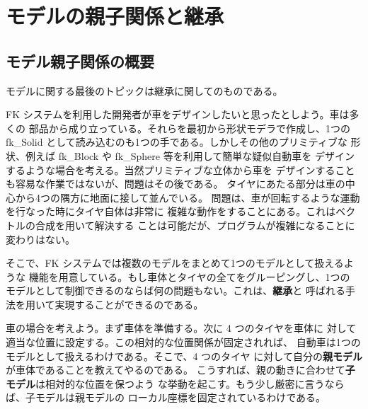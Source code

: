 \section{モデルの親子関係と継承}
\subsection{モデル親子関係の概要}
モデルに関する最後のトピックは継承に関してのものである。

FK システムを利用した開発者が車をデザインしたいと思ったとしよう。車は多くの
部品から成り立っている。それらを最初から形状モデラで作成し、1つの
fk\_Solid として読み込むのも1つの手である。しかしその他のプリミティブな
形状、例えば fk\_Block や fk\_Sphere 等を利用して簡単な疑似自動車を
デザインするような場合を考える。当然プリミティブな立体から車を
デザインすることも容易な作業ではないが、問題はその後である。
タイヤにあたる部分は車の中心から4つの隅方に地面に接して並んでいる。
問題は、車が回転するような運動を行なった時にタイヤ自体は非常に
複雑な動作をすることにある。これはベクトルの合成を用いて解決する
ことは可能だが、プログラムが複雑になることに変わりはない。

そこで、FK システムでは複数のモデルをまとめて1つのモデルとして扱えるような
機能を用意している。もし車体とタイヤの全てをグルーピングし、1つの
モデルとして制御できるのならば何の問題もない。これは、\textbf{継承}と
呼ばれる手法を用いて実現することができるのである。

車の場合を考えよう。まず車体を準備する。次に 4 つのタイヤを車体に
対して適当な位置に設定する。この相対的な位置関係が固定されれば、
自動車は1つのモデルとして扱えるわけである。そこで、4 つのタイヤ
に対して自分の\textbf{親モデル}が車体であることを教えてやるのである。
こうすれば、親の動きに合わせて\textbf{子モデル}は相対的な位置を保つよう
な挙動を起こす。もう少し厳密に言うならば、子モデルは親モデルの
ローカル座標を固定されているわけである。

